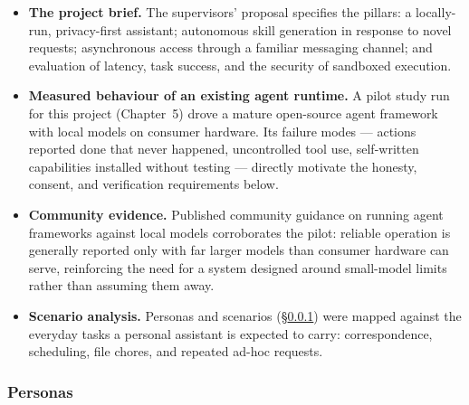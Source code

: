\documentclass[12pt]{article}
\begin{document}
\begin{itemize}[itemsep=2pt]
  \item \textbf{The project brief.} The supervisors' proposal specifies the
    pillars: a locally-run, privacy-first assistant; autonomous skill
    generation in response to novel requests; asynchronous access through a
    familiar messaging channel; and evaluation of latency, task success, and
    the security of sandboxed execution.
  \item \textbf{Measured behaviour of an existing agent runtime.} A pilot
    study run for this project (Chapter~5) drove a mature open-source agent
    framework with local models on consumer hardware. Its failure modes ---
    actions reported done that never happened, uncontrolled tool use,
    self-written capabilities installed without testing --- directly motivate
    the honesty, consent, and verification requirements below.
  \item \textbf{Community evidence.} Published community guidance on running
    agent frameworks against local models corroborates the pilot: reliable
    operation is generally reported only with far larger models than consumer
    hardware can serve, reinforcing the need for a system designed around
    small-model limits rather than assuming them away.
  \item \textbf{Scenario analysis.} Personas and scenarios
    (\S\ref{sec:personas}) were mapped against the everyday tasks a personal
    assistant is expected to carry: correspondence, scheduling, file chores,
    and repeated ad-hoc requests.
\end{itemize}

\subsubsection{Personas}\label{sec:personas}
\end{document}
